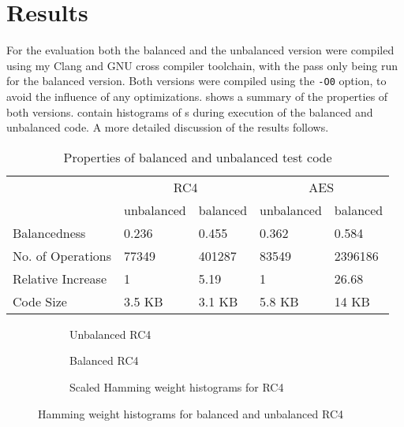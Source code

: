 \section{Results}
\label{results}
For the evaluation both the balanced and the unbalanced version were compiled using my Clang and GNU cross compiler toolchain, with the pass only being run for the balanced version.
Both versions were compiled using the \texttt{-O0} option, to avoid the influence of any optimizations.
 shows a summary of the properties of both versions.
 contain histograms of \hammingw{}s during execution of the balanced and unbalanced code.
A more detailed discussion of the results follows.
  
\begin{table}[h]
  \begin{tabular}{|l|l|l|l|l|}
    \hline
    & \multicolumn{2}{c|}{RC4}  & \multicolumn{2}{c|}{AES} \\
    \cline{2-5}
    & unbalanced & balanced & unbalanced & balanced \\
    \cline{2-5}
    Balancedness      & 0.236 & 0.455 & 0.362  & 0.584 \\
    No. of Operations & 77349 & 401287 & 83549 & 2396186 \\
    Relative Increase & 1 & 5.19 & 1 & 26.68 \\
    Code Size            & 3.5 KB & 3.1 KB & 5.8 KB & 14 KB \\
    \hline
  \end{tabular}
  \caption{Properties of balanced and unbalanced test code}
  \label{tbl:properties}
\end{table}

\begin{figure}[hp]
  \centering
  \begin{subfigure}[b]{0.49\textwidth}
    
    \caption{Unbalanced RC4}
  \end{subfigure}
  \begin{subfigure}[b]{0.49\textwidth}
    
    \caption{Balanced RC4}
  \end{subfigure}

  \begin{subfigure}[b]{\textwidth}
    
    \caption{Scaled Hamming weight histograms for RC4}
  \end{subfigure}
  \caption{Hamming weight histograms for balanced and unbalanced RC4}
  \label{fig:rc4}
\end{figure}

